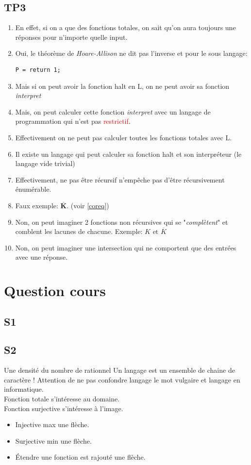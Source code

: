 \documentclass{report}
\begin{document}
\section{TP3}
\begin{enumerate}
\item En effet, si on a que des fonctions totales, on sait qu'on aura toujours une réponses pour n'importe quelle input.
\item Oui, le théorème de \textit{Hoare-Allison} ne dit pas l'inverse et pour le sous langage:
\begin{lstlisting}
P = return 1;
\end{lstlisting}
\item Mais si on peut avoir la fonction halt en L, on ne peut avoir sa fonction \textit{interpret}
\item Mais, on peut calculer cette fonction \textit{interpret} avec un langage de programmation qui n'est pas \textcolor{red}{restrictif}.
\item Effectivement on ne peut pas calculer toutes les fonctions totales avec L.
\item Il existe un langage qui peut calculer sa fonction halt et son interpréteur (le langage vide trivial)
\item Effectivement, ne pas être récursif n'empêche pas d'être récursivement énumérable.
\item Faux exemple: $\overline{\textbf{K}}$. (voir \ref{coreq})
\item Non, on peut imaginer 2 fonctions non récursives qui se "\textit{complètent}" et comblent les lacunes de chacune. Exemple: $K \text{ et } \overline{K}$
\item Non, on peut imaginer une intersection qui ne comportent que des entrées avec une réponse.
\end{enumerate}

\chapter{Question cours}
\section{S1}

\section{S2}
Une densité du nombre de rationnel
Un langage est un ensemble de chaine de caractère ! Attention de ne pas confondre langage le mot vulgaire et langage en informatique.\\
Fonction totale s'intéresse au domaine.\\
Fonction surjective s'intéresse à l'image.\\
\begin{itemize}
\item Injective max une flèche.
\item Surjective min une flèche.
\item Étendre une fonction est rajouté une flèche.
\end{itemize}
\end{document}
